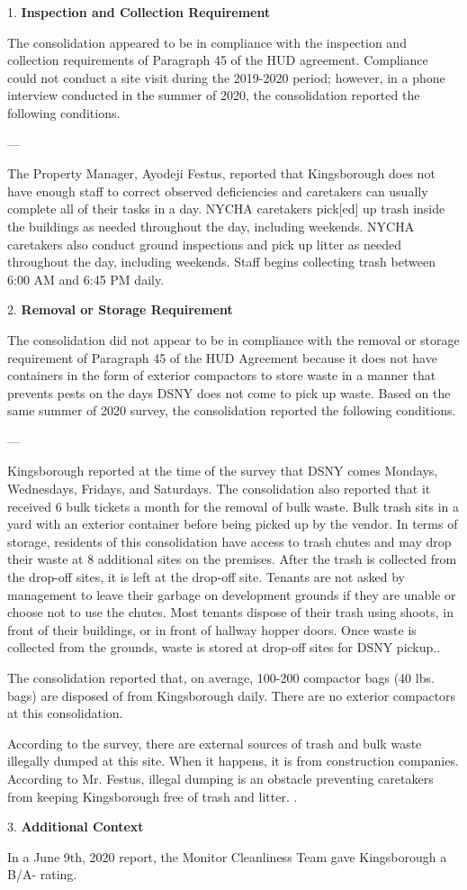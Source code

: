 

1. \textbf{Inspection and Collection Requirement}

The consolidation appeared to be in compliance with the inspection and collection requirements of Paragraph 45 of the HUD agreement. Compliance could not conduct a site visit during the 2019-2020 period; however, in a phone interview conducted in the summer of 2020, the consolidation reported the following conditions.

---

The Property Manager, Ayodeji Festus, reported that Kingsborough does not have enough staff to correct observed deficiencies and caretakers can  usually complete all of their tasks in a day. NYCHA caretakers pick[ed] up trash inside the buildings as needed throughout the day, including weekends. NYCHA caretakers also conduct ground inspections and pick up litter as needed throughout the day, including weekends. Staff begins collecting trash between 6:00 AM and 6:45 PM daily. 

2. \textbf{Removal or Storage Requirement}

The consolidation did not appear to be in compliance with the removal or storage requirement of Paragraph 45 of the HUD Agreement because it does not have containers in the form of exterior compactors to store waste in a manner that prevents pests on the days DSNY does not come to pick up waste. Based on the same summer of 2020 survey, the consolidation reported the following conditions.

---

Kingsborough reported at the time of the survey that DSNY comes Mondays, Wednesdays, Fridays, and Saturdays. The consolidation also reported that it received 6 bulk tickets a month for the removal of bulk waste. Bulk trash sits in a yard with an exterior container before being picked up by the vendor. In terms of storage, residents of this consolidation have access to trash chutes and may drop their waste at 8 additional sites on the premises. After the trash is collected from the drop-off sites, it is left at the drop-off site. Tenants are not asked by management to leave their garbage on development grounds if they are unable or choose not to use the chutes. Most tenants dispose of their trash using shoots, in front of their buildings, or in front of hallway hopper doors. Once waste is collected from the grounds, waste is stored at drop-off sites for DSNY pickup..

The consolidation reported that, on average, 100-200 compactor bags (40 lbs. bags) are disposed of from Kingsborough daily. There are no exterior compactors at this consolidation.

According to the survey, there are external sources of trash and bulk waste illegally dumped at this site. When it happens, it is from construction companies. According to Mr. Festus, illegal dumping is an obstacle preventing caretakers from keeping Kingsborough free of trash and litter. .

3. \textbf{Additional Context}

In a June 9th, 2020 report, the Monitor Cleanliness Team gave Kingsborough a B/A- rating.